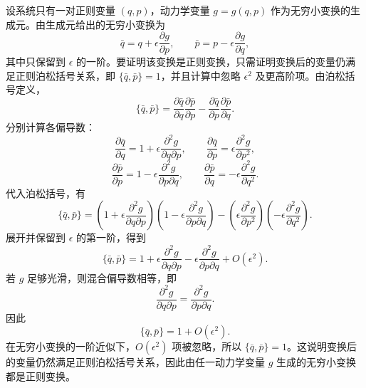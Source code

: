 \begin{solution}[无穷小变换与正则变换]
\answer
设系统只有一对正则变量 $(q,p)$，动力学变量 $g=g(q,p)$ 作为无穷小变换的生成元。由生成元给出的无穷小变换为
\[
\bar q=q+\epsilon \frac{\partial g}{\partial p},\qquad 
\bar p=p-\epsilon \frac{\partial g}{\partial q},
\]
其中只保留到 $\epsilon$ 的一阶。要证明该变换是正则变换，只需证明变换后的变量仍满足正则泊松括号关系，即 $\{\bar q,\bar p\}=1$，并且计算中忽略 $\epsilon^2$ 及更高阶项。由泊松括号定义，
\[
\{\bar q,\bar p\}=\frac{\partial \bar q}{\partial q}\frac{\partial \bar p}{\partial p}-\frac{\partial \bar q}{\partial p}\frac{\partial \bar p}{\partial q}.
\]
分别计算各偏导数：
\[
\frac{\partial \bar q}{\partial q}=1+\epsilon\frac{\partial^2 g}{\partial q\partial p},\qquad 
\frac{\partial \bar q}{\partial p}=\epsilon\frac{\partial^2 g}{\partial p^2},
\]
\[
\frac{\partial \bar p}{\partial p}=1-\epsilon\frac{\partial^2 g}{\partial p\partial q},\qquad 
\frac{\partial \bar p}{\partial q}=-\epsilon\frac{\partial^2 g}{\partial q^2}.
\]
代入泊松括号，有
\[
\{\bar q,\bar p\}
=\left(1+\epsilon\frac{\partial^2 g}{\partial q\partial p}\right)
\left(1-\epsilon\frac{\partial^2 g}{\partial p\partial q}\right)
-\left(\epsilon\frac{\partial^2 g}{\partial p^2}\right)
\left(-\epsilon\frac{\partial^2 g}{\partial q^2}\right).
\]
展开并保留到 $\epsilon$ 的第一阶，得到
\[
\{\bar q,\bar p\}=1+\epsilon\frac{\partial^2 g}{\partial q\partial p}-\epsilon\frac{\partial^2 g}{\partial p\partial q}+O(\epsilon^2).
\]
若 $g$ 足够光滑，则混合偏导数相等，即
\[
\frac{\partial^2 g}{\partial q\partial p}=\frac{\partial^2 g}{\partial p\partial q}.
\]
因此
\[
\{\bar q,\bar p\}=1+O(\epsilon^2).
\]
在无穷小变换的一阶近似下，$O(\epsilon^2)$ 项被忽略，所以 $\{\bar q,\bar p\}=1$。这说明变换后的变量仍然满足正则泊松括号关系，因此由任一动力学变量 $g$ 生成的无穷小变换都是正则变换。
\end{solution}

